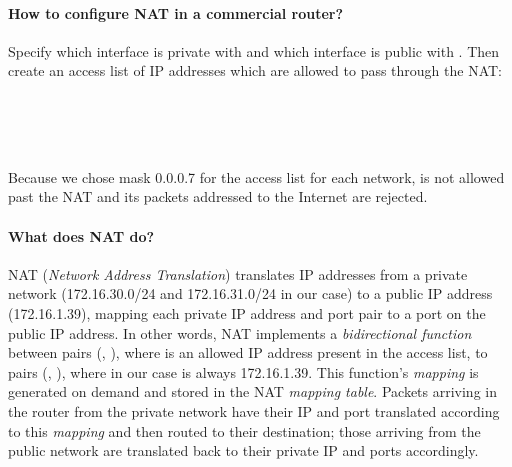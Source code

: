\documentclass[compilation.tex]{subfiles}
\begin{document}
\paragraph{How to configure NAT in a commercial router?}
Specify which interface is private with  and which interface is public with . Then create an access list of IP addresses which are allowed to pass through the NAT:
\begin{center}
\begin{minipage}{0.7\textwidth}
	\\
	\\
	\\
\end{minipage}
\end{center}
Because we chose mask 0.0.0.7 for the access list for each network,  is not allowed past the NAT and its packets addressed to the Internet are rejected.

\paragraph{What does NAT do?}
NAT (\textsl{Network Address Translation}) translates IP addresses from a private network (172.16.30.0/24 and 172.16.31.0/24 in our case) to a public IP address (172.16.1.39), mapping each private IP address and port pair to a port on the public IP address. In other words, NAT implements a \textsl{bidirectional function} between pairs (, ), where  is an allowed IP address present in the access list, to pairs (, ), where  in our case is always 172.16.1.39. This function's \textsl{mapping} is generated on demand and stored in the NAT \textsl{mapping table}. Packets arriving in the router from the private network have their IP and port translated according to this \textsl{mapping} and then routed to their destination; those arriving from the public network are translated back to their private IP and ports accordingly.
\end{document}
